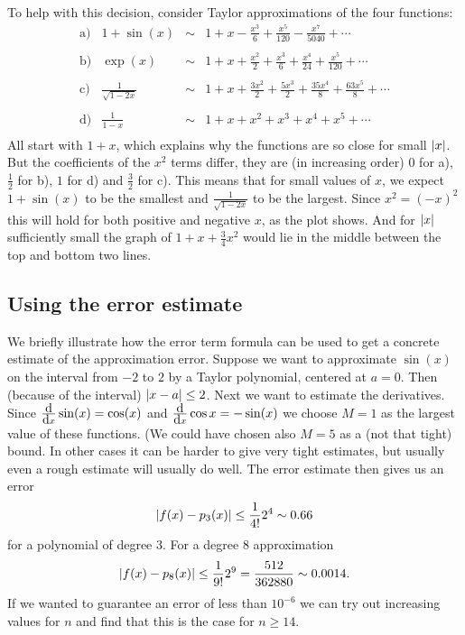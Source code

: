 To help with this decision, consider Taylor approximations of the four
functions:
\[
\begin{array}{lrcl}
\mbox{a)}&  1+\sin(x)&\sim&{\displaystyle%
1+x-\frac{x^3}{6}+\frac{x^5}{120}-\frac{x^7}{5040}+\cdots}\\
\\
\mbox{b)}&  \exp(x)&\sim&{\displaystyle%
1+x+\frac{x^2}{2}+\frac{x^3}{6}+\frac{x^4}{24}+\frac{x^5}{120}+\cdots}\\
\\
\mbox{c)}&{\displaystyle  \frac{1}{\sqrt{1-2x}}}&\sim&{\displaystyle%
1+x+\frac{3x^2}{2}+\frac{5x^3}{2}+\frac{35x^4}{8}+\frac{63x^5}{8}+\cdots}\\
\\
\mbox{d)}&{\displaystyle  \frac{1}{1-x}}&\sim&{\displaystyle%
1+x+x^2+x^3+x^4+x^5+\cdots}\\
\end{array}
\]
All start with $1+x$, which explains why the functions are so close for
small $\left|x\right|$. But the coefficients of the $x^2$ terms differ, they are (in
increasing order) $0$ for a), $\frac12$ for b), $1$ for d) and $\frac32$ for
c). This means that for small values of $x$, we expect $1+\sin(x)$ to be the
smallest and $\frac{1}{\sqrt{1-2x}}$ to be the largest. Since $x^2=(-x)^2$
this will hold for both positive and negative $x$, as the plot shows.
And for $\left|x\right|$ sufficiently small the graph of $1+x+\frac34x^2$
would lie in the middle between the top and bottom two lines.


\subsection{Using the error estimate}

We briefly illustrate how the error term formula can be used to get a
concrete estimate of the approximation error. Suppose we
want to approximate $\sin(x)$ on the interval from $-2$ to $2$ by a Taylor
polynomial, centered at $a=0$. Then (because of the interval) $\left|x-a\right|\le
2$. Next we want to estimate the derivatives. Since $\frac{\mbox{d}}{\mbox{d}x}\sin(x)=\cos(x)$
and $\frac{\mbox{d}}{\mbox{d}x}\cos{x}=-\sin(x)$ we choose $M=1$ as the largest value of these
functions. (We could have chosen also $M=5$ as a (not that tight) bound. In
other cases it can be harder to give very tight estimates, but usually even
a rough estimate will usually do well. The error estimate then gives us an
error
\[
\left|f(x)-p_3(x)\right|\le \frac{1}{4!}2^4\sim 0.66
\]
for a polynomial of degree $3$.
For a degree 8 approximation 
\[
\left|f(x)-p_8(x)\right|\le \frac{1}{9!}2^9=\frac{512}{362880}\sim 0.0014.
\]
If we wanted to guarantee an error of less than $10^{-6}$ we can try out
increasing values for $n$  and find that this is the case for $n\ge 14$.
\smallskip

